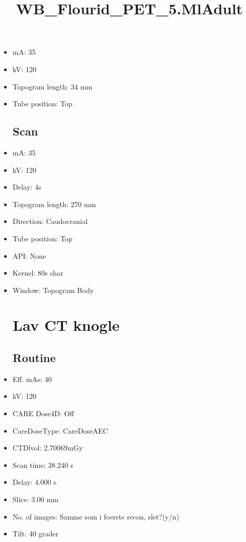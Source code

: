 \documentclass[12pt]{article}
\title{WB\_Flourid\_PET\_5.MlAdult}
\begin{document}
\maketitle
\newpage
\tableofcontents
\newpage
{}


\begin{itemize}\section{Topogram}
\subsection{Routine}
\item mA: 35\item kV: 120\item Topogram length: 34 mm\item Tube position: Top
\subsection{Scan}\item mA: 35\item kV: 120\item Delay: 4s\item Topogram length: 270 mm\item Direction: Caudocranial\item Tube position: Top\item API: None\item Kernel: 80s shar\item Window: Topogram Body
\section{Lav CT knogle}
\subsection{Routine}
\item Eff. mAs: 40\item kV: 120\item CARE Dose4D: Off\item CareDoseType: CareDoseAEC\item CTDlvol: 2.70069mGy\item Scan time: 38.240 s\item Delay: 4.000 s\item Slice: 3.00 mm\item No. of images: Samme som i foerste recon, slet?(y/n)\item Tilt: 40 grader

\end{itemize}
\end{document}
